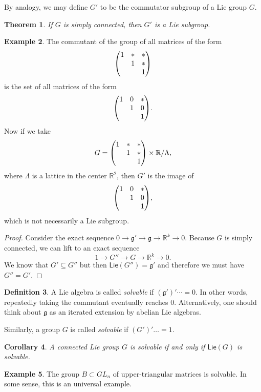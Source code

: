 \documentclass[leqno, openany]{memoir}
\newtheorem{thm}{Theorem}[section]
\newtheorem{cor}[thm]{Corollary}
\theoremstyle{definition}
\newtheorem{defn}[thm]{Definition}
\newtheorem{exm}[thm]{Example}
\theoremstyle{remark}
\theoremstyle{plain}
\theoremstyle{definition}
\theoremstyle{remark}
\newcommand{\R}{\mathbb{R}}
\newcommand{\mf}[1]{\mathfrak{#1}}
\newcommand{\ms}[1]{\mathsf{#1}}
\begin{document}
By analogy, we may define $G'$ to be the commutator subgroup of a Lie group $G$.

\begin{thm}
    If $G$ is simply connected, then $G'$ is a Lie subgroup.
\end{thm}

\begin{exm}
    The commutant of the group of all matrices of the form
    \[ \mqty( 1 & * & * \\ & 1 & * \\ & & 1 ) \]
    is the set of all matrices of the form 
    \[ \mqty( 1 & 0 & * \\ & 1 & 0 \\ & & 1 ). \]
    Now if we take 
    \[ G = \mqty( 1 & * & * \\ & 1 & * \\ & & 1 ) \times \R / \Lambda, \]
    where $\Lambda$ is a lattice in the center $\R^2$, then $G'$ is the image of 
    \[ \mqty( 1 & 0 & * \\ & 1 & 0 \\ & & 1 ), \]
    which is not necessarily a Lie subgroup.
\end{exm}

\begin{proof}
    Consider the exact sequence $0 \to \mf{g}' \to \mf{g} \to \R^k \to 0$. Because $G$ is simply connected, we can lift to an exact sequence
    \[ 1 \to G'' \to G \to \R^k \to 0. \]
    We know that $G' \subseteq G''$ but then $\ms{Lie}(G'') = \mf{g}'$ and therefore we must have $G'' = G'$.
\end{proof}

\begin{defn}
    A Lie algebra is called \textit{solvable} if $(\mf{g}')'\cdots = 0$. In other words, repeatedly taking the commutant eventually reaches $0$. Alternatively, one should think about $\mf{g}$ as an iterated extension by abelian Lie algebras.
\end{defn}

Similarly, a group $G$ is called \textit{solvable} if $(G')' \ldots = 1$. 

\begin{cor}
    A connected Lie group $G$ is solvable if and only if $\ms{Lie}(G)$ is solvable.
\end{cor}

\begin{exm}
    The group $B \subset GL_n$ of upper-triangular matrices is solvable. In some sense, this is an universal example.
\end{exm}
\end{document}
